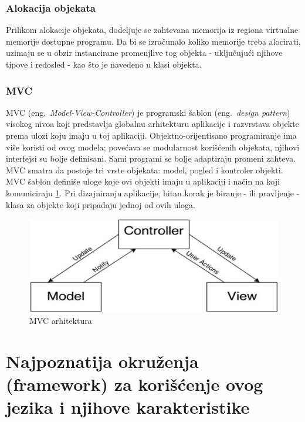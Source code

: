 \documentclass[a4paper]{article}
\begin{document}
{\subsubsection{Alokacija objekata}
Prilikom alokacije objekata, dodeljuje se zahtevana memorija iz regiona virtualne memorije dostupne programu. Da bi se izračunalo koliko memorije treba alocirati, uzimaju se u obzir instancirane promenjlive tog objekta - uključujući njihove tipove i redosled - kao što je navedeno u klasi objekta.

\subsubsection{MVC}
MVC (eng.~{\em Model-View-Controller}) \cite{mvc} je programski šablon (eng.~{\em design pattern}) visokog nivoa koji predstavlja globalnu arhitekturu aplikacije i razvrstava objekte prema ulozi koju imaju u toj aplikaciji.
Objektno-orijentisano programiranje ima više koristi od ovog modela; povećava se modularnost korišćenih objekata, njihovi interfejsi su bolje definisani. Sami programi se bolje adaptiraju promeni zahteva.
MVC smatra da postoje tri vrste objekata: model, pogled i kontroler objekti. MVC šablon definiše uloge koje ovi objekti imaju u aplikaciji i način na koji komuniciraju \ref{fig:MVC}. Pri dizajniranju aplikacije, bitan korak je biranje - ili pravljenje - klasa za objekte koji pripadaju jednoj od ovih uloga. 
\begin{figure}[h!]
	\begin{center}
	\includegraphics[scale=0.6]{traditional_mvc1}
	\caption{MVC arhitektura}	
	\label{fig:MVC}
	\end{center}
\end{figure}

\section{Najpoznatija okruženja (framework) za korišćenje ovog jezika i njihove karakteristike}
\label{sec:okruzenja}
}
\end{document}
